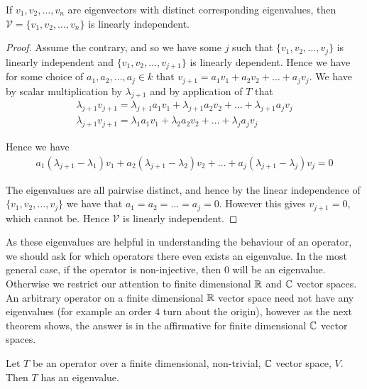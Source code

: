 \documentclass[]{article}
\begin{document}
\begin{thm}
		If $v_1, v_2, \ldots, v_n$ are eigenvectors with distinct corresponding eigenvalues, then $\mathcal{V} = \{v_1, v_2, \ldots, v_n\}$ is linearly independent.
\end{thm}

\begin{proof}
		Assume the contrary, and so we have some $j$ such that $\{v_1, v_2, \ldots, v_j\}$ is linearly independent and $\{v_1, v_2, \ldots, v_{j+1}\}$ is linearly dependent. Hence we have for some choice of $a_1, a_2, \ldots, a_j \in k$ that $v_{j+1} = a_1 v_1 + a_2 v_2 + \ldots + a_j v_j$. We have by scalar multiplication by $\lambda_{j+1}$ and by application of $T$ that
		\begin{align*}
				\lambda_{j+1} v_{j+1} = \lambda_{j+1} a_1 v_1 + \lambda_{j+1} a_2 v_2 + \ldots + \lambda_{j+1} a_j v_j \\
				\lambda_{j+1} v_{j+1} = \lambda_1 a_1 v_1 + \lambda_2 a_2 v_2 + \ldots + \lambda_j a_j v_j
		\end{align*}

		Hence we have 
		\begin{align*}
				a_1 (\lambda_{j+1} - \lambda_1) v_1 + a_2 (\lambda_{j+1} - \lambda_2) v_2 + \ldots + a_j (\lambda_{j+1} - \lambda_j) v_j = 0
		\end{align*}

		The eigenvalues are all pairwise distinct, and hence by the linear independence of $\{v_1, v_2, \ldots, v_j\}$ we have that $a_1 = a_2 = \ldots = a_j = 0$. However this gives $v_{j+1} = 0$, which cannot be. Hence $\mathcal{V}$ is linearly independent. 
\end{proof}

As these eigenvalues are helpful in understanding the behaviour of an operator, we should ask for which operators there even exists an eigenvalue. In the most general case, if the operator is non-injective, then $0$ will be an eigenvalue. Otherwise we restrict our attention to finite dimensional $\mathbb{R}$ and $\mathbb{C}$ vector spaces. An arbitrary operator on a finite dimensional $\mathbb{R}$ vector space need not have any eigenvalues (for example an order $4$ turn about the origin), however as the next theorem shows, the answer is in the affirmative for finite dimensional $\mathbb{C}$ vector spaces.

\begin{thm}
		Let $T$ be an operator over a finite dimensional, non-trivial, $\mathbb{C}$ vector space, $V$. Then $T$ has an eigenvalue.
\end{thm}
\end{document}
